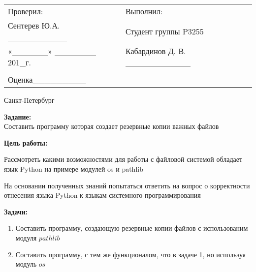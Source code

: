 \documentclass[12pt]{article}
\begin{document}
\begin{center}
\begin{tabular}{lllll}
Проверил:	 	 						& \hspace{80pt}	&	Выполнил:										&\\
Сентерев Ю.А.	 \_\_\_\_\_\_\_\_\_\_	&			    &	Студент группы P3255							&\\
«\_\_\_\_\_\_» 	 \_\_\_\_\_\_\_ 201\_г.  & 				&	Кабардинов Д. В. \_\_\_\_\_\_\_\_\_\_\_			&\\
										&				&													&\\
Оценка\hspace{12pt}\_\_\_\_\_\_\_\_\_	&				&													&\\
\end{tabular}
\par\bigskip\par\bigskip\par\bigskip
                                                  
\par\bigskip \par\bigskip
\end{center}
\par\bigskip\par\bigskip\par\bigskip\par\bigskip\par\bigskip\par\bigskip\par\bigskip\par\bigskip
\begin{center}
Санкт-Петербург
\par{}
\end{center}
\pagebreak
\textbf{Задание:} \\
Составить программу которая создает резервные копии важных файлов \\
\par

\textbf{ Цель работы:}
\begin{list}{-}{}
\item Рассмотреть какими возможностями для работы с файловой системой обладает язык Python на примере модулей os и pathlib
\item На основании полученных знаний попытаться ответить на вопрос о корректности отнесения языка Python к языкам системного программирования
\end{list}

\textbf{ Задачи:}
\begin{enumerate}
\item Составить программу, создающую резервные копии файлов с использованим модуля $pathlib$
\item Составить программу, с тем же функционалом, что в задаче 1, но используя модуль $os$
\end{enumerate}
\end{document}
